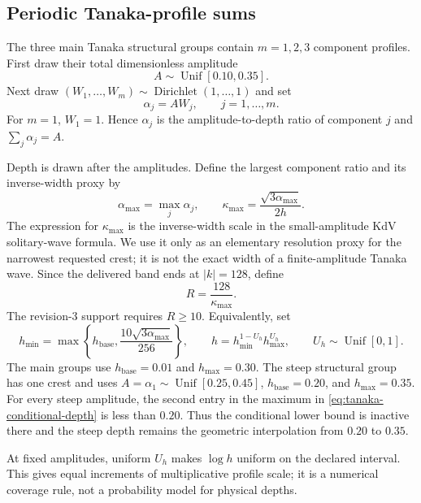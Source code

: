 \documentclass[10pt]{article}
\begin{document}
\subsection{Periodic Tanaka-profile sums}

The three main Tanaka structural groups contain $m=1,2,3$ component profiles.
First draw their total dimensionless amplitude
\[
  A\sim\operatorname{Unif}[0.10,0.35].
\]
Next draw
$(W_1,\ldots,W_m)\sim\operatorname{Dirichlet}(1,\ldots,1)$ and set
\[
  \alpha_j=AW_j,
  \qquad j=1,\ldots,m.
\]
For $m=1$, $W_1=1$.  Hence $\alpha_j$ is the amplitude-to-depth ratio of
component $j$ and $\sum_j\alpha_j=A$.

Depth is drawn after the amplitudes.  Define the largest component ratio and
its inverse-width proxy by
\begin{equation}
  \alpha_{\max}=\max_j\alpha_j,
  \qquad
  \kappa_{\max}=\frac{\sqrt{3\alpha_{\max}}}{2h}.
  \label{eq:tanaka-kdv-scale}
\end{equation}
The expression for $\kappa_{\max}$ is the inverse-width scale in the
small-amplitude KdV solitary-wave formula.  We use it only as an elementary
resolution proxy for the narrowest requested crest; it is not the exact
width of a finite-amplitude Tanaka wave.  Since the delivered band ends at
$|k|=128$, define
\begin{equation}
  R=\frac{128}{\kappa_{\max}}.
  \label{eq:tanaka-resolution-ratio}
\end{equation}
The revision-3 support requires $R\geq10$.  Equivalently, set
\begin{equation}
  h_{\min}
  =\max\!\left\{
    h_{\mathrm{base}},
    \frac{10\sqrt{3\alpha_{\max}}}{256}
  \right\},
  \qquad
  h=h_{\min}^{1-U_h}h_{\max}^{U_h},
  \qquad
  U_h\sim\operatorname{Unif}[0,1].
  \label{eq:tanaka-conditional-depth}
\end{equation}
The main groups use $h_{\mathrm{base}}=0.01$ and $h_{\max}=0.30$.
The steep structural group has one crest and uses
$A=\alpha_1\sim\operatorname{Unif}[0.25,0.45]$,
$h_{\mathrm{base}}=0.20$, and $h_{\max}=0.35$.  For every steep amplitude,
the second entry in the maximum in \eqref{eq:tanaka-conditional-depth} is
less than $0.20$.  Thus the conditional lower bound is inactive there and
the steep depth remains the geometric interpolation from $0.20$ to $0.35$.

At fixed amplitudes, uniform $U_h$ makes $\log h$ uniform on the declared
interval.  This gives equal increments of multiplicative profile scale; it
is a numerical coverage rule, not a probability model for physical depths.
\end{document}
